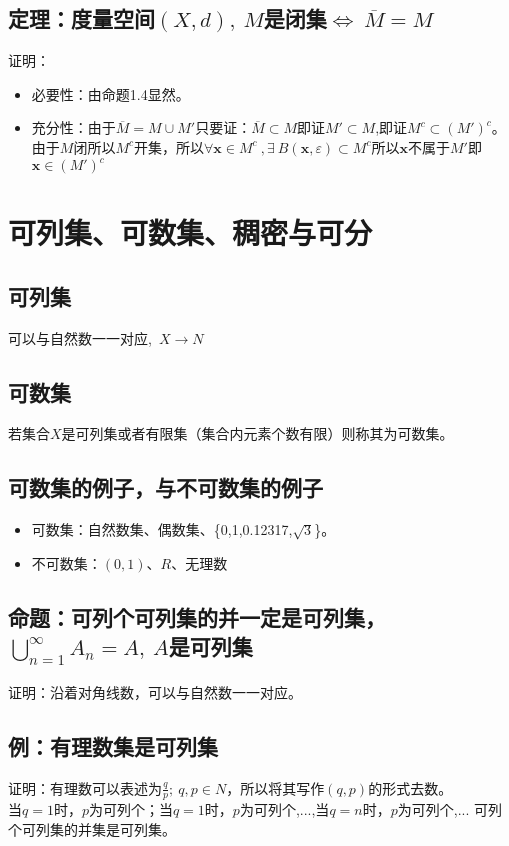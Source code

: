 \documentclass[11pt]{article}
\begin{document}
\begin{CJK*}{UTF8}{gbsn}
\subsection{定理：度量空间$(X,d),~M$是闭集$\Leftrightarrow ~\overline{M}=M$}
证明：\\
\begin{itemize}
	\item 必要性：由命题1.4显然。
	\item 充分性：由于$\overline{M}=M\cup M'$只要证：$\overline{M}\subset M$即证$M'\subset M$,即证$M^c\subset (M')^c$。\\
	由于$M$闭所以$M^c$开集，所以$\forall \bm x\in M^c~,\exists ~B(\bm x,\varepsilon )\subset M^c$所以$\bm x$不属于$M'$即$\bm x\in (M')^c $
\end{itemize}
\section{可列集、可数集、稠密与可分}
\subsection{可列集}
可以与自然数一一对应,~$X\rightarrow N$
\subsection{可数集}
若集合$X$是可列集或者有限集（集合内元素个数有限）则称其为可数集。
\subsection{可数集的例子，与不可数集的例子}
\begin{itemize}
	\item 可数集：自然数集、偶数集、\{0,1,0.12317,$\sqrt{3}$\}。
	\item 不可数集：$(0,1)$、$R$、无理数
\end{itemize}


\subsection{命题：可列个可列集的并一定是可列集，$\bigcup^{\infty}_{n=1} A_n=A,~A$是可列集}
证明：沿着对角线数，可以与自然数一一对应。

\subsection{例：有理数集是可列集}
证明：有理数可以表述为$\frac{q}{p};~q,p\in N$，所以将其写作$(q,p)$的形式去数。\\
当$q=1$时，$p$为可列个；当$q=1$时，$p$为可列个,...,当$q=n$时，$p$为可列个,...
可列个可列集的并集是可列集。



\end{CJK*}
\end{document}
